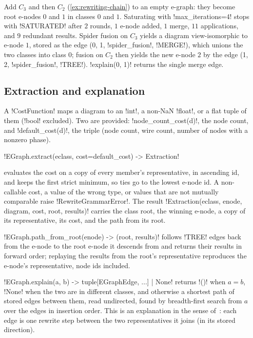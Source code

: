 \begin{example}[A merge]\label{ex:rewriting-merge}
Add $C_3$ and then $C_2$ (\cref{ex:rewriting-chain}) to an empty e-graph: they become root e-nodes
$0$ and $1$ in classes $0$ and $1$. Saturating with \py!max_iterations=4! stops with
\code!SATURATED! after $2$ rounds, $1$ e-node added, $1$ merge, $11$ applications, and $9$
redundant results. Spider fusion on $C_3$ yields a diagram view-isomorphic to e-node $1$, stored as
the edge (0, 1, \code!spider_fusion!, \code!MERGE!), which unions the two classes into class $0$;
fusion on $C_2$ then yields the new e-node $2$ by the edge (1, 2, \code!spider_fusion!, \code!TREE!).
\py!explain(0, 1)! returns the single merge edge.
\end{example}

\subsection{Extraction and explanation}

A \py!CostFunction! maps a diagram to an \py!int!, a non-NaN \py!float!, or a flat tuple of them
(\py!bool! excluded). Two are provided: \py!node_count_cost(d)!, the node count, and
\py!default_cost(d)!, the triple (node count, wire count, number of nodes with a nonzero phase).

\begin{signature}
\py!EGraph.extract(eclass, cost=default_cost) -> Extraction!
\end{signature}
evaluates the cost on a copy of every member's representative, in ascending id, and keeps the
first strict minimum, so ties go to the lowest e-node id. A non-callable cost, a value of the wrong
type, or values that are not mutually comparable raise \py!RewriteGrammarError!. The result
\py!Extraction(eclass, enode, diagram, cost, root, results)! carries the class root, the winning
e-node, a copy of its representative, its cost, and the path from its root.

\py!EGraph.path_from_root(enode) -> (root, results)! follows \code!TREE! edges back from the e-node
to the root e-node it descends from and returns their results in forward order; replaying the
results from the root's representative reproduces the e-node's representative, node ids included.

\py!EGraph.explain(a, b) -> tuple[EGraphEdge, ...] | None! returns \py!()! when $a=b$, \py!None!
when the two are in different classes, and otherwise a shortest path of stored edges between them,
read undirected, found by breadth-first search from $a$ over the edges in insertion order. This is
an explanation in the sense of~\cite{flatt2022proofs}: each edge is one rewrite step between the
two representatives it joins (in its stored direction).

